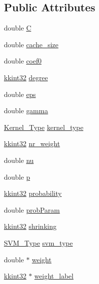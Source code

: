 \subsection*{Public Attributes}
\begin{DoxyCompactItemize}
\item 
double \hyperlink{struct_s_v_m289___m_f_s_1_1svm__parameter_aac66b1e8a16d4076bfe8b45e82bd8e7a}{C}
\item 
double \hyperlink{struct_s_v_m289___m_f_s_1_1svm__parameter_a08f7b3453369bccdfe43fd9ea1f28241}{cache\+\_\+size}
\item 
double \hyperlink{struct_s_v_m289___m_f_s_1_1svm__parameter_a3f9f18f528dc4eb5c499e80c6b6af3c2}{coef0}
\item 
\hyperlink{namespace_k_k_b_a8fa4952cc84fda1de4bec1fbdd8d5b1b}{kkint32} \hyperlink{struct_s_v_m289___m_f_s_1_1svm__parameter_a4c45977ba07de7038c6ecd091a7684f0}{degree}
\item 
double \hyperlink{struct_s_v_m289___m_f_s_1_1svm__parameter_aa5c12a469759ffdc931e8b8ef2496cc4}{eps}
\item 
double \hyperlink{struct_s_v_m289___m_f_s_1_1svm__parameter_af967d55614f8fe7c1da5936a9f2b048d}{gamma}
\item 
\hyperlink{namespace_s_v_m289___m_f_s_ad985d190115342f6434e0ed8816b6e29}{Kernel\+\_\+\+Type} \hyperlink{struct_s_v_m289___m_f_s_1_1svm__parameter_aeaa6b9df55b7ce77adebe83b1ef797ee}{kernel\+\_\+type}
\item 
\hyperlink{namespace_k_k_b_a8fa4952cc84fda1de4bec1fbdd8d5b1b}{kkint32} \hyperlink{struct_s_v_m289___m_f_s_1_1svm__parameter_a7c87bf61e72f27b04efe132672b432a1}{nr\+\_\+weight}
\item 
double \hyperlink{struct_s_v_m289___m_f_s_1_1svm__parameter_a51d3d06c7a7a38a8c315092f14c3029c}{nu}
\item 
double \hyperlink{struct_s_v_m289___m_f_s_1_1svm__parameter_a4b725c044491ebddf8f2c290af4fd288}{p}
\item 
\hyperlink{namespace_k_k_b_a8fa4952cc84fda1de4bec1fbdd8d5b1b}{kkint32} \hyperlink{struct_s_v_m289___m_f_s_1_1svm__parameter_a34eba918ae65f56f3186bbdeae8ccd4b}{probability}
\item 
double \hyperlink{struct_s_v_m289___m_f_s_1_1svm__parameter_af0c23086f2b9c8373008aac5f396dba0}{prob\+Param}
\item 
\hyperlink{namespace_k_k_b_a8fa4952cc84fda1de4bec1fbdd8d5b1b}{kkint32} \hyperlink{struct_s_v_m289___m_f_s_1_1svm__parameter_aee00cd2472bcdd191d7616750078e3f8}{shrinking}
\item 
\hyperlink{namespace_s_v_m289___m_f_s_ace392faef6440cf56ebff6b360e7d72a}{S\+V\+M\+\_\+\+Type} \hyperlink{struct_s_v_m289___m_f_s_1_1svm__parameter_a803dee598ce609cc4ccb4fdbfa99cd1b}{svm\+\_\+type}
\item 
double $\ast$ \hyperlink{struct_s_v_m289___m_f_s_1_1svm__parameter_a6d64cad82215930bd3f55b3c3ef7c543}{weight}
\item 
\hyperlink{namespace_k_k_b_a8fa4952cc84fda1de4bec1fbdd8d5b1b}{kkint32} $\ast$ \hyperlink{struct_s_v_m289___m_f_s_1_1svm__parameter_a729c98939a2e1a5859fcad70bbabf063}{weight\+\_\+label}
\end{DoxyCompactItemize}
